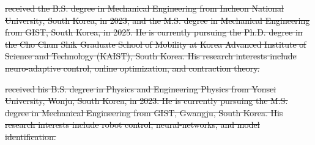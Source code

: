 \documentclass[letterpaper, journal]{IEEEtran}
\newcommand*{\template}{template}
\providecommand{\DIFdel}[1]{{\protect\color{red}\sout{#1}}} %
\providecommand{\DIFdelbegin}{} %
\providecommand{\DIFdelend}{} %
\begin{document}
\DIFdelbegin %
\DIFdel{received the B.S. degree in Mechanical Engineering from Incheon National University, South Korea, in 2023, and the M.S. degree in Mechanical Engineering from GIST, South Korea, in 2025. 
    He is currently pursuing the Ph.D. degree in the Cho Chun Shik Graduate School of Mobility at Korea Advanced Institute of Science and Technology (KAIST), South Korea.
    His research interests include neuro-adaptive control, online optimization, and contraction theory.
}%
\DIFdelend %

\DIFdelbegin %
\DIFdel{received his B.S. degree in Physics and Engineering Physics from Yonsei University, Wonju, South Korea, in 2023. He is currently pursuing the M.S. degree in Mechanical Engineering from GIST, Gwangju, South Korea.  
His research interests include robot control, neural-networks, and model identification. 
}%
\DIFdelend %
\end{document}
